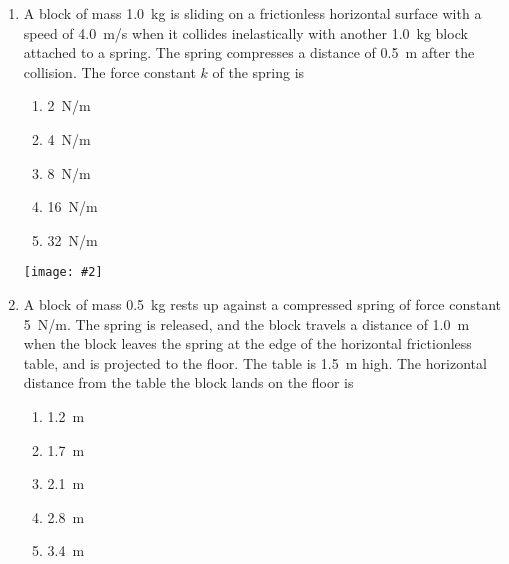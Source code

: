 \documentclass[12pt]{article}
\newcommand{\pic}[2]{\texttt{[image: \#2]}}
\begin{document}
\begin{enumerate}[leftmargin=50pt,label=\underline{\hspace{0.4in}} \arabic*.]
  \vspace{-.45in}\begin{center}
  \end{center}
  
\item\vspace{-0.2in} A block of mass \SI{1.0}{\kg} is sliding on a frictionless
  horizontal
  surface with a speed of \SI{4.0}{m/s} when it collides inelastically with
  another \SI{1.0}{kg} block attached to a spring. The spring compresses a
  distance of \SI{0.5}{m} after the collision. The force constant $k$ of the
  spring is
  \begin{enumerate}[noitemsep,topsep=0pt]
  \item\SI{2}{N/m}
  \item\SI{4}{N/m}
  \item\SI{8}{N/m}
  \item\SI{16}{N/m}
  \item\SI{32}{N/m}
  \end{enumerate}

  \begin{center}
    \pic{0.45}{projectile.png}
  \end{center}
  
\item A block of mass \SI{0.5}{kg} rests up against a compressed spring of force
  constant \SI{5}{N/m}. The spring is released, and the block travels a distance
  of \SI{1.0}{m} when the block leaves the spring at the edge of the horizontal
  frictionless table, and is projected to the floor. The table is \SI{1.5}{m}
  high. The horizontal distance from the table the block lands on the floor is
  \begin{enumerate}[noitemsep,topsep=0pt]
  \item\SI{1.2}{\metre}
  \item\SI{1.7}{\metre}
  \item\SI{2.1}{\metre}
  \item\SI{2.8}{\metre}
  \item\SI{3.4}{\metre}
  \end{enumerate}
\end{enumerate}
\end{document}
